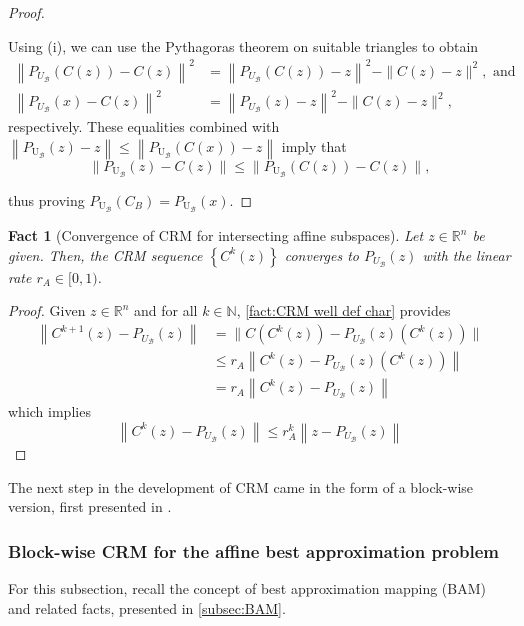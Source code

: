 \documentclass[smallextended,numbook,nospthms]{svjour3}
\theoremstyle{plain}
\newtheorem{fact}[theorem]{Fact}
\theoremstyle{definition}
\def\RR{\mathds R}
\def\NN{\mathds N}
\begin{document}
\begin{proof}
\begin{listi}
		Using (i), we can use the Pythagoras theorem on suitable triangles to obtain
		\begin{align}
			\left\|P_{U_{\mathcal{B}}}(C(z))-C(z)\right\|^{2} &=\left\|P_{U_{\mathcal{B}}}(C(z))-z\right\|^{2}-\|C(z)-z\|^{2}, \text{ and }\\
			\left\|P_{U_{\mathcal{B}}}(x)-C(z)\right\|^{2} &=\left\|P_{U_{\mathcal{B}}}(z)-z\right\|^{2}-\|C(z)-z\|^{2},
		\end{align}
		respectively. These equalities combined with $\left\|P_{\mathrm{U_{\mathcal{B}}}}(z)-z\right\| \leq\left\|P_{\mathrm{U_{\mathcal{B}}}}(C(x))-z\right\|$ imply that
		\[
		\| P_{\mathrm{U_{\mathcal{B}}}}(z)-C(z)\|\leq\| P_{\mathrm{U_{\mathcal{B}}}}(C(z))-C(z) \|,
		\]
	\end{listi}
	thus proving $P_{\mathrm{U_{\mathcal{B}}}}\left(C_B\right)=P_{\mathrm{U_{\mathcal{B}}}}(x)$.
\end{proof}

\begin{fact}[Convergence of CRM for intersecting affine subspaces]\label{fact:CRM conv aff}
Let $z \in \RR^{n}$ be given. Then, the CRM sequence $\left\{C^{k}(z)\right\}$ converges to $P_{{U_{\mathcal{B}}}}(z)$ with the linear rate $r_{A} \in [0,1)$.
\end{fact}
\begin{proof}
Given $z \in \RR^{n}$ and for all $k \in \NN$, \cref{fact:CRM well def char} provides
\begin{align}
\left\|C^{k+1}(z)-P_{{U_{\mathcal{B}}}}(z)\right\|
&=\| C\left(C^{k}(z)\right)-P_{{U_{\mathcal{B}}}}(z)\left(C^{k}(z)\right)\| \\
&\leq r_{A}\left\|C^{k}(z)-P_{{U_{\mathcal{B}}}}(z)\left(C^{k}(z)\right)\right\| \\
&=r_{A}\left\|C^{k}(z)-P_{{U_{\mathcal{B}}}}(z)\right\|
\end{align}
which implies
\[
\left\|C^{k}(z)-P_{{U_{\mathcal{B}}}}(z)\right\| \leq r_{A}^{k}\left\|z-P_{{U_{\mathcal{B}}}}(z)\right\|
\]
\end{proof}

The next step in the development of CRM came in the form of a block-wise version, first presented in \cite{Behling:2019dj}.
\subsubsection{Block-wise CRM for the affine best approximation problem}\label{subsubsec:block-wise CRM}
For this subsection, recall the concept of best approximation mapping (BAM) and related facts, presented in \cref{subsec:BAM}.
\end{document}
